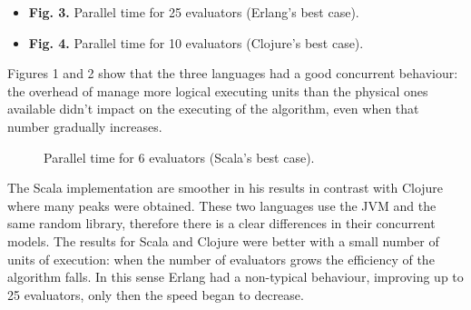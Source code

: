 %     

%     


\begin{multicols}{2}
\begin{small}
\begin{itemize}
\item[] \textbf{Fig. 3.} Parallel time for 25 evaluators (Erlang's best case).
    

\columnbreak
\item[] \textbf{Fig. 4.} Parallel time for 10 evaluators (Clojure's best case).
    

\end{itemize}
\end{small}
\end{multicols}

Figures 1 and 2 show that the three languages had a good concurrent
behaviour: the overhead of manage more logical executing units than
the physical ones available didn't impact on the executing of the
algorithm, even when that number gradually increases.  
%
\setcounter{figure}{5}
%
\begin{figure}
\caption{Parallel time for 6 evaluators (Scala's best case).}
\centering
    
\end{figure}

The Scala implementation are smoother in his results in contrast with
Clojure where many peaks were obtained. %
These two languages use the JVM
and the same random library, therefore there is a clear differences in
their concurrent models. The results for Scala and Clojure were better
with a small number of units of execution: when the number of evaluators
grows the efficiency of the algorithm falls. In this sense Erlang had
a non-typical behaviour,  improving up to 25 evaluators, only
then the speed began to decrease. 

